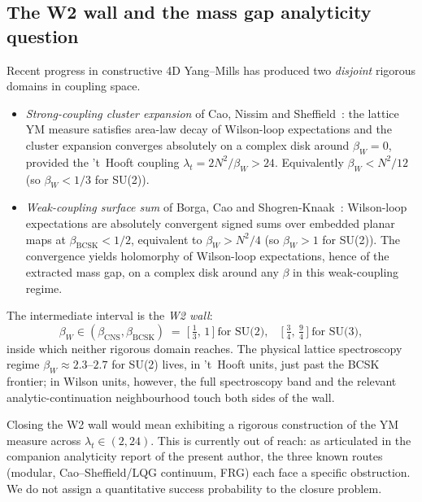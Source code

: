 \documentclass[11pt,a4paper]{article}
\theoremstyle{definition}
\theoremstyle{remark}
\begin{document}
\subsection{The W2 wall and the mass gap analyticity question}

Recent progress in constructive 4D Yang--Mills has produced two
\emph{disjoint} rigorous domains in coupling space.

\begin{itemize}
\item \emph{Strong-coupling cluster expansion} of
Cao, Nissim and Sheffield~\cite{CNS25a,CNS25b}: the lattice YM
measure satisfies area-law decay of Wilson-loop expectations and
the cluster expansion converges absolutely on a complex disk
around $\beta_W = 0$, provided the 't~Hooft coupling
$\lambda_t = 2N^2/\beta_W > 24$. Equivalently
$\beta_W < N^2/12$ (so $\beta_W < 1/3$ for SU(2)).

\item \emph{Weak-coupling surface sum} of
Borga, Cao and Shogren-Knaak~\cite{BCSK24}: Wilson-loop
expectations are absolutely convergent signed sums over embedded
planar maps at $\beta_{\mathrm{BCSK}} < 1/2$, equivalent to
$\beta_W > N^2/4$ (so $\beta_W > 1$ for SU(2)). The convergence
yields holomorphy of Wilson-loop expectations, hence of the
extracted mass gap, on a complex disk around any $\beta$ in this
weak-coupling regime.
\end{itemize}

The intermediate interval is the \emph{W2 wall}:
\begin{equation}
\beta_W \in (\beta_{\mathrm{CNS}}, \beta_{\mathrm{BCSK}})
\;=\;
\bigl[\,\tfrac13,\,1\,\bigr]\ \text{for SU(2)},
\quad
\bigl[\,\tfrac34,\,\tfrac94\,\bigr]\ \text{for SU(3)},
\label{eq:W2wall}
\end{equation}
inside which neither rigorous domain reaches. The physical lattice
spectroscopy regime $\beta_W \approx 2.3$--$2.7$ for SU(2)
\cite[Tab.~34]{AthenodorouTeper2021} lives, in 't~Hooft units,
just past the BCSK frontier; in Wilson units, however, the full
spectroscopy band and the relevant analytic-continuation
neighbourhood touch both sides of the wall.

Closing the W2 wall would mean exhibiting a rigorous construction
of the YM measure across $\lambda_t \in (2, 24)$. This is currently
out of reach: as articulated in the companion analyticity report
\cite{W2analyticite2026} of the present author, the three known
routes (modular, Cao--Sheffield/LQG continuum, FRG) each face a
specific obstruction. We do not assign a quantitative success
probability to the closure problem.
\end{document}
